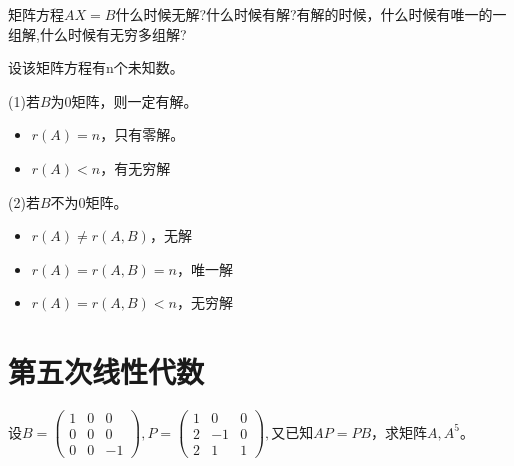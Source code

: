 \documentclass[a4paper]{report}
\begin{document}
\EX 矩阵方程$AX = B$什么时候无解?什么时候有解?有解的时候，什么时候有唯一的一组解,什么时候有无穷多组解?

\begin{jie}
设该矩阵方程有n个未知数。

(1)若$B$为0矩阵，则一定有解。
\begin{itemize}
\item $r(A)=n$，只有零解。
\item $r(A)<n$，有无穷解
\end{itemize}

(2)若$B$不为0矩阵。
\begin{itemize}
  \item $r(A)\neq r(A,B)$，无解
  \item $r(A)= r(A,B)=n$，唯一解
  \item $r(A)= r(A,B)<n$，无穷解
\end{itemize}
\end{jie}
\clearpage
\section{第五次线性代数}
\setcounter{Emp}{39}
\EX 设$
B=
\begin{pmatrix}
1&0&0\\
0&0&0\\
0&0&-1
\end{pmatrix},
P=
\begin{pmatrix}
1&0&0\\
2&-1&0\\
2&1&1
\end{pmatrix},$又已知$AP=PB$，求矩阵$A,A^5$。
\end{document}
